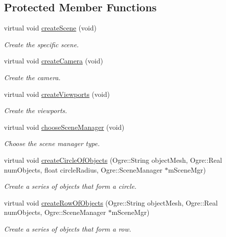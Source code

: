 \subsection*{Protected Member Functions}
\begin{DoxyCompactItemize}
\item 
virtual void \hyperlink{class_basic_tutorial2_a4c08f070e21c7cd1f6c415ada8587322}{create\+Scene} (void)
\begin{DoxyCompactList}\small\item\em Create the specific scene. \end{DoxyCompactList}\item 
virtual void \hyperlink{class_basic_tutorial2_affb4d35ed7a64245dec901ae6dbf3497}{create\+Camera} (void)
\begin{DoxyCompactList}\small\item\em Create the camera. \end{DoxyCompactList}\item 
virtual void \hyperlink{class_basic_tutorial2_afb03154c0535bf45f5c3207ddabd4cc5}{create\+Viewports} (void)
\begin{DoxyCompactList}\small\item\em Create the viewports. \end{DoxyCompactList}\item 
virtual void \hyperlink{class_basic_tutorial2_a3074f67362154fce4c99af74c1d7c949}{choose\+Scene\+Manager} (void)
\begin{DoxyCompactList}\small\item\em Choose the scene manager type. \end{DoxyCompactList}\item 
virtual void \hyperlink{class_basic_tutorial2_a633e601ce8a0ac132be83c93ebadb04b}{create\+Circle\+Of\+Objects} (Ogre\+::\+String object\+Mesh, Ogre\+::\+Real num\+Objects, float circle\+Radius, Ogre\+::\+Scene\+Manager $\ast$m\+Scene\+Mgr)
\begin{DoxyCompactList}\small\item\em Create a series of objects that form a circle. \end{DoxyCompactList}\item 
virtual void \hyperlink{class_basic_tutorial2_a92c76d3d02cb8f8fca92ff214bb34139}{create\+Row\+Of\+Objects} (Ogre\+::\+String object\+Mesh, Ogre\+::\+Real num\+Objects, Ogre\+::\+Scene\+Manager $\ast$m\+Scene\+Mgr)
\begin{DoxyCompactList}\small\item\em Create a series of objects that form a row. \end{DoxyCompactList}\item 

\end{DoxyCompactItemize}
